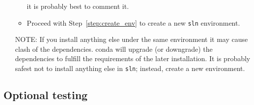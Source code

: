 \documentclass[10pt,titlepage,fleqn]{article}
\begin{document}
\begin{enumerate}
\begin{itemize}
it is probably best to comment it.

\item Proceed with Step~\ref{step:create_env} to create a new \verb+sln+ environment.

\end{itemize}

NOTE: If you install anything else under the same environment it may cause clash of the dependencies. conda will upgrade (or downgrade) the dependencies to fulfill the requirements of the later installation. It is probably safest not to install anything else in \verb+sln+; instead, create a new environment.

\end{enumerate}


\subsection{Optional testing}
\end{document}
